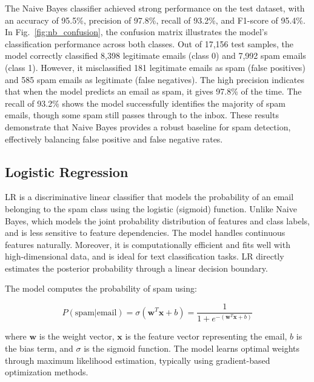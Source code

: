 \documentclass[12pt]{article}
\begin{document}
The Naive Bayes classifier achieved strong performance on the test dataset, with an accuracy of 95.5\%, precision of 97.8\%, recall of 93.2\%, and F1-score of 95.4\%. In Fig.~\ref{fig:nb_confusion}, the confusion matrix illustrates the model's classification performance across both classes. Out of 17,156 test samples, the model correctly classified  8,398 legitimate emails (class 0) and 7,992 spam emails (class 1). However, it misclassified 181 legitimate emails as spam (false positives) and 585 spam emails as legitimate (false negatives). The high precision indicates that when the model predicts an email as spam, it gives 97.8\% of the time. The recall of 93.2\% shows the model successfully identifies the majority of spam emails, though some spam still passes through to the inbox. These results demonstrate that Naive Bayes provides a robust baseline for spam detection, effectively balancing false positive and false negative rates.


\subsection{Logistic Regression}
LR is a discriminative linear classifier that models the probability of an email belonging to the spam class using the logistic (sigmoid) function. Unlike Naive Bayes, which models the joint probability distribution of features and class labels, and is less sensitive to feature dependencies. The model handles continuous features naturally. Moreover, it is computationally efficient and fits well with high-dimensional data, and is ideal for text classification tasks. LR directly estimates the posterior probability through a linear decision boundary.

The model computes the probability of spam using:

\begin{equation}
P(\text{spam}|\text{email}) = \sigma(\mathbf{w}^T\mathbf{x} + b) = \frac{1}{1 + e^{-(\mathbf{w}^T\mathbf{x} + b)}}
\end{equation}

where $\mathbf{w}$ is the weight vector, $\mathbf{x}$ is the feature vector representing the email, $b$ is the bias term, and $\sigma$ is the sigmoid function. The model learns optimal weights through maximum likelihood estimation, typically using gradient-based optimization methods.
\end{document}
